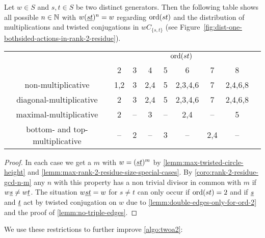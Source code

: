 \begin{coro}
	Let $w \in S$ and $s,t \in S$ be two distinct generators. Then the following table shows all possible $n \in \mathbb{N}$ with $w(\underline{s} \underline{t})^n = w$ regarding $\operatorname{ord}(st)$ and the distribution of multiplications and twisted conjugations in $wC_{\{s,t\}}$ (see Figure~\ref{fig:dist-one-bothsided-actions-in-rank-2-residue}).

	\begin{center}
		\begin{tabular}{c|ccccccc|c}
													& \multicolumn{7}{c|}{$\operatorname{ord}(st)$} \\
													& 2 & 3 & 4 & 5 & 6 & 7 & 8 \\
			\hline
			\textrm{non-multiplicative}				& 1,2 & 3 & 2,4 & 5 & 2,3,4,6 & 7 & 2,4,6,8 \\
			\textrm{diagonal-multiplicative}		& 2 & 3 & 2,4 & 5 & 2,3,4,6 & 7 & 2,4,6,8 \\
			\textrm{maximal-multiplicative}			& 2 & -- & 3 & -- & 2,4 & -- & 5 \\
			\textrm{bottom- and top-multiplicative}	& -- & 2 & -- & 3 & -- & 2,4 & -- \\
		\end{tabular}		
	\end{center}

	\begin{proof}
		In each case we get a $m$ with $w = (\underline{s} \underline{t})^m$ by \ref{lemm:max-twisted-circle-height} and \ref{lemm:max-rank-2-residue-size-special-cases}. By \ref{coro:rank-2-residue-gcd-n-m} any $n$ with this property has a non trivial divisor in common with $m$ if $w \underline{s} \neq w \underline{t}$. The situation $w \underline{s} \underline{t} = w$ for $s \neq t$ can only occur if $\operatorname{ord}(st) = 2$ and if $\underline{s}$ and $\underline{t}$ act by twisted conjugation on $w$ due to \ref{lemm:double-edges-only-for-ord-2} and the proof of \ref{lemm:no-triple-edges}.
	\end{proof}
\end{coro}

We use these restrictions to further improve \ref{algo:twoa2}:

